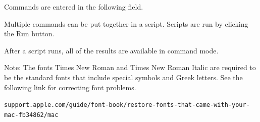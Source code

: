 

Commands are entered in the following field.

\begin{center}
\end{center}

Multiple commands can be put together in a script.
Scripts are run by clicking the Run button.

\begin{center}
\end{center}

After a script runs, all of the results are available in command mode.

\bigskip
Note: The fonts Times New Roman and Times New Roman Italic are required
to be the standard fonts that include special symbols and Greek letters.
See the following link for correcting font problems.

\bigskip
{\footnotesize\verb$support.apple.com/guide/font-book/restore-fonts-that-came-with-your-mac-fb34862/mac$}


